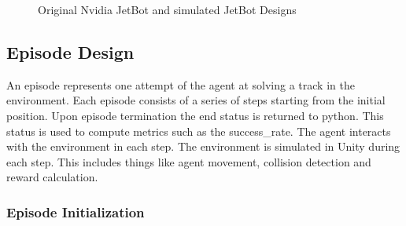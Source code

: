 \begin{figure}
    \centering
    \qquad
    \qquad
    \qquad
    \caption{Original Nvidia JetBot and simulated JetBot Designs}
    \label{fig:jetbots}
\end{figure}


\subsection{Episode Design}

An episode represents one attempt of the agent at solving a track in the environment. Each episode consists of a series of steps starting from the initial position. Upon episode termination the end status is returned to python. This status is used to compute metrics such as the success\_rate. The agent interacts with the environment in each step. The environment is simulated in Unity during each step. This includes things like agent movement, collision detection and reward calculation.

\subsubsection{Episode Initialization}


